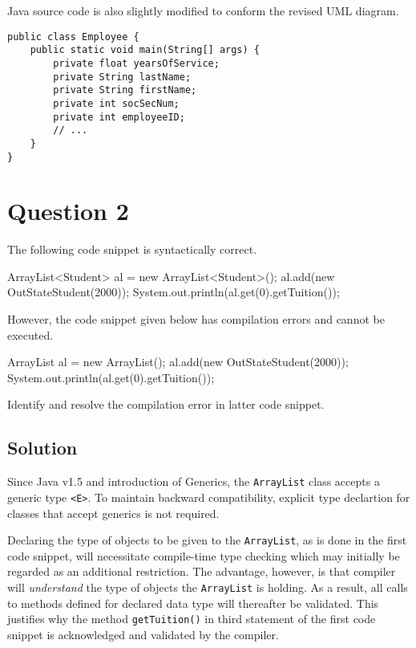 Java source code is also slightly modified to conform the revised UML diagram.

\begin{lstlisting}
public class Employee {
	public static void main(String[] args) {
		private float yearsOfService;
		private String lastName;
		private String firstName;
		private int socSecNum;
		private int employeeID;
		// ...
	}
}
\end{lstlisting}

\section{Question 2}

The following code snippet is syntactically correct.

\begin{darkListing}
ArrayList<Student> al = new ArrayList<Student>();
al.add(new OutStateStudent(2000));
System.out.println(al.get(0).getTuition());
\end{darkListing}

However, the code snippet given below has compilation errors and cannot be executed.

\begin{darkListing}
ArrayList al = new ArrayList();
al.add(new OutStateStudent(2000));
System.out.println(al.get(0).getTuition());
\end{darkListing}

Identify and resolve the compilation error in latter code snippet.

\subsection*{Solution}

Since Java v1.5 and introduction of Generics, the \texttt{ArrayList} class accepts a generic type \texttt{<E>}.
To maintain backward compatibility, explicit type declartion for classes that accept generics is not required.

Declaring the type of objects to be given to the \texttt{ArrayList}, as is done in the first code snippet, will necessitate compile-time type checking which may initially be regarded as an additional restriction.
The advantage, however, is that compiler will \textit{understand} the type of objects the \texttt{ArrayList} is holding.
As a result, all calls to methods defined for declared data type will thereafter be validated.
This justifies why the method \texttt{getTuition()} in third statement of the first code snippet is acknowledged and validated by the compiler.

